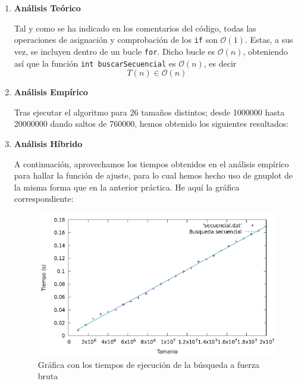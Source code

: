 \documentclass[10pt,a4paper]{article}
\begin{document}
\begin{enumerate}
	\item \textbf{Análisis Teórico}
	
	
	
	Tal y como se ha indicado en los comentarios del código, todas las operaciones de asignación y comprobación de los \texttt{if} son \(\mathcal{O}(1)\). Estas, a sus vez, se incluyen dentro de un bucle \texttt{for}. Dicho bucle es \(\mathcal{O}(n)\), obteniendo así que la función \texttt{int buscarSecuencial} es \(\mathcal{O}(n)\), es decir
	\[
	T(n) \in \mathcal{O}(n)
	\]
	
	\item \textbf{Análisis Empírico}
	
	Tras ejecutar el algoritmo para 26 tamaños distintos; desde 1000000 hasta 20000000 dando saltos de 760000, hemos obtenido los siguientes resultados:
	
	\begin{table}[h!]
	\centering
	\footnotesize
	\caption{Experiencia empírica de la búsqueda a fuerza bruta}
    \end{table}

	\item \textbf{Análisis Híbrido}
	
	A continuación, aprovechamos los tiempos obtenidos en el análisis empírico para hallar la función de ajuste, para lo cual hemos hecho uso de gnuplot de la misma forma que en la anterior práctica. He aquí la gráfica correspondiente:
	
	\begin{figure}[h!]
		\centering
		\includegraphics[scale=0.55]{./Images/Grafica_secuencial.png}
		\caption{Gráfica con los tiempos de ejecución de la búsqueda a fuerza bruta}
	\end{figure}


\end{enumerate}
\end{document}
